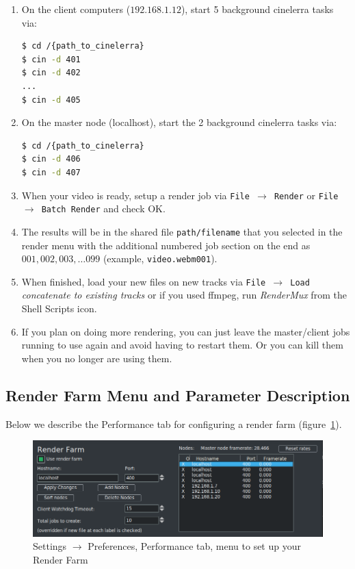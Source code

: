 \begin{enumerate}
    \item On the client computers ($192.168.1.12$), start 5 background cinelerra tasks via:
    \begin{lstlisting}[language=bash,numbers=none]
$ cd /{path_to_cinelerra}
$ cin -d 401
$ cin -d 402 
...
$ cin -d 405
    \end{lstlisting}
    \item On the master node (localhost), start the 2 background cinelerra tasks via:
    \begin{lstlisting}[language=bash,numbers=none]
$ cd /{path_to_cinelerra}
$ cin -d 406
$ cin -d 407
    \end{lstlisting}
    \item When your video is ready, setup a render job via \texttt{File $\rightarrow$  Render} or \texttt{File $\rightarrow$  Batch Render} and check OK.
    \item The results will be in the shared file \texttt{path/filename} that you selected in the render menu with the
    additional numbered job section on the end as  $001, 002, 003, \dots 099$ (example, \texttt{video.webm001}).
    \item When finished, load your new files on new tracks via  \texttt{File  $\rightarrow$ Load} \textit{concatenate to existing tracks}  or if you used ffmpeg, run \textit{RenderMux} from the Shell Scripts icon.
    \item If you plan on doing more rendering, you can just leave the master/client jobs running to use again
    and avoid having to restart them.  Or you can kill them when you no longer are using them.
\end{enumerate}

\subsection{Render Farm Menu and Parameter Description}%
\label{sub:render_farm_parameter_description}

Below we describe the Performance tab for configuring a render farm (figure~\ref{fig:farm}).

\begin{figure}[htpb]
    \centering
    \includegraphics[width=0.8\linewidth]{images/farm.png}
    \caption{Settings $\rightarrow$ Preferences, Performance tab, menu to set up your Render Farm}
    \label{fig:farm}
\end{figure}

